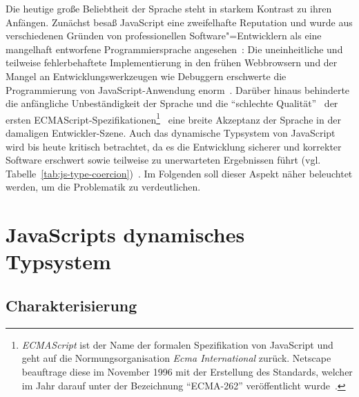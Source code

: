 Die heutige große Beliebtheit der Sprache steht in starkem Kontrast zu ihren Anfängen. Zunächst besaß JavaScript eine zweifelhafte Reputation und wurde aus verschiedenen Gründen von professionellen Software"=Entwicklern als eine mangelhaft entworfene Programmiersprache angesehen~\autocite{CROCKFORD:JS_POPULAR}: Die uneinheitliche und teilweise fehlerbehaftete Implementierung in den frühen Webbrowsern und der Mangel an Entwicklungswerkzeugen wie Debuggern erschwerte die Programmierung von JavaScript-Anwendung enorm~\autocite{OREILLY:JS_HOW_DID_WE_GET_THERE}. Darüber hinaus behinderte die anfängliche Unbeständigkeit der Sprache und die \enquote{schlechte Qualität}~\autocite{CROCKFORD:JS_MISUNDERSTOOD} der ersten ECMAScript-Spezifikationen\footnote{\textit{ECMAScript} ist der Name der formalen Spezifikation von JavaScript und geht auf die Normungsorganisation \textit{Ecma International} zurück. Netscape beauftrage diese im November 1996 mit der Erstellung des Standards, welcher im Jahr darauf unter der Bezeichnung \enquote{ECMA-262} veröffentlicht wurde~\autocite{ECMASCRIPT:1997}.}~\autocite{ECMASCRIPT:1997} eine breite Akzeptanz der Sprache in der damaligen Entwickler-Szene. Auch das dynamische Typsystem von JavaScript wird bis heute kritisch betrachtet, da es die Entwicklung sicherer und korrekter Software erschwert sowie teilweise zu unerwarteten Ergebnissen führt (vgl. Tabelle~\ref{tab:js-type-coercion})~\autocite{NIKHIL:2014,PRADEL:2015}. Im Folgenden soll dieser Aspekt näher beleuchtet werden, um die Problematik zu verdeutlichen.

\section{JavaScripts dynamisches Typsystem}

\subsection{Charakterisierung}

